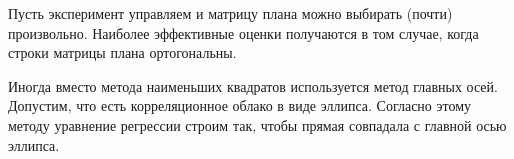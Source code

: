 \begin{remark}
  Пусть эксперимент управляем и матрицу плана можно выбирать (почти)
  произвольно. Наиболее эффективные оценки получаются в том случае, когда строки
  матрицы плана ортогональны.
\end{remark}

\begin{remark}
  Иногда вместо метода наименьших квадратов используется метод главных осей.
  Допустим, что есть корреляционное облако в виде эллипса. Согласно этому методу
  уравнение регрессии строим так, чтобы прямая совпадала с главной осью эллипса.
\end{remark}
